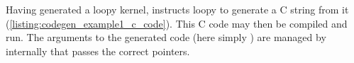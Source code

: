 \documentclass[thesis]{subfiles}
\begin{document}
\begin{example}
Having generated a loopy kernel,  instructs loopy to generate a C string from it (\cref{listing:codegen_example1_c_code}).
This C code may then be compiled and run.
The arguments to the generated code (here simply ) are managed by  internally that passes the correct pointers.


\end{example}
\end{document}
